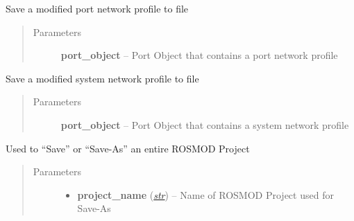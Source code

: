 \documentclass[letterpaper,10pt,english]{sphinxmanual}
\begin{document}
\begin{fulllineitems}
\begin{fulllineitems}
\end{fulllineitems}


\begin{fulllineitems}
\label{class_Project:ROSMOD_Project.save_pnp}
Save a modified port network profile to file
\begin{quote}\begin{description}
\item[{Parameters}] \leavevmode
\textbf{port\_object} -- Port Object that contains a port network profile

\end{description}\end{quote}

\end{fulllineitems}


\begin{fulllineitems}
\label{class_Project:ROSMOD_Project.save_snp}
Save a modified system network profile to file
\begin{quote}\begin{description}
\item[{Parameters}] \leavevmode
\textbf{port\_object} -- Port Object that contains a system network profile

\end{description}\end{quote}

\end{fulllineitems}


\begin{fulllineitems}
\label{class_Project:ROSMOD_Project.save}
Used to ``Save'' or ``Save-As'' an entire ROSMOD Project
\begin{quote}\begin{description}
\item[{Parameters}] \leavevmode\begin{itemize}
\item {} 
\textbf{project\_name} (\href{http://docs.python.org/library/functions.html\#str}{\emph{str}}) -- Name of ROSMOD Project used for Save-As


\end{itemize}
\end{description}
\end{quote}
\end{fulllineitems}
\end{fulllineitems}
\end{document}
